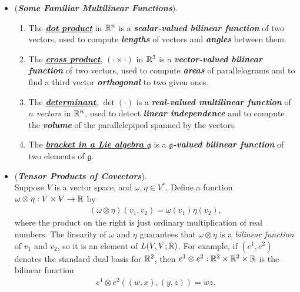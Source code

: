 \documentclass[11pt]{article}
\begin{document}
\begin{itemize}
\item \begin{example} (\emph{\textbf{Some Familiar Multilinear Functions}}).\\
\begin{enumerate}
\item The \underline{\emph{\textbf{dot product}}}  in ${\mathbb R}^n$ is a \emph{\textbf{scalar-valued bilinear function}} of two vectors, used
to compute \emph{\textbf{lengths}} of vectors and \emph{\textbf{angles}} between them.
\item The \underline{\emph{\textbf{cross product}}}, $(\cdot \times \cdot)$ in ${\mathbb R}^3$ is a \emph{\textbf{vector-valued bilinear function}} of two vectors, used
to compute \emph{\textbf{areas}} of parallelograms and to find a third vector \emph{\textbf{orthogonal}} to two given ones.
\item The \underline{\emph{\textbf{determinant}}}, $\det(\cdot)$ is a \emph{\textbf{real-valued multilinear function}} of \emph{$n$ vectors} in ${\mathbb R}^n$, used
to detect \emph{\textbf{linear independence}} and to compute the \emph{\textbf{volume}} of the parallelepiped spanned by the vectors.
\item The \underline{\emph{\textbf{bracket in a Lie algebra $\mathfrak{g}$}}} is a \emph{\textbf{$\mathfrak{g}$-valued bilinear function}} of two elements of $\mathfrak{g}$.
\end{enumerate}
\end{example}

\item \begin{example}(\emph{\textbf{Tensor Products of Covectors}}).\\
Suppose $V$ is a vector space, and $\omega, \eta \in V^{*}$. Define a function $\omega \otimes \eta: V \times V \rightarrow {\mathbb R}$ by
\begin{align*}
(\omega \otimes \eta)(v_1,v_2) =\omega(v_1) \eta(v_2),
\end{align*} where the product on the right is just ordinary multiplication of real numbers. The linearity of $\omega$ and $\eta$ guarantees that $\omega \otimes \eta$ is a \emph{bilinear function} of $v_1$ and $v_2$, so it is an element of $L(V,V ; {\mathbb R})$. For example, if $(e^1, e^2)$ denotes the standard dual basis for ${\mathbb R}^2$, then $e^1 \otimes e^2: {\mathbb R}^2 \times {\mathbb R}^2 \times {\mathbb R}$ is the bilinear function
\begin{align*}
e^1 \otimes e^2((w,x), (y,z)) = wz.
\end{align*}
\end{example}


\end{itemize}
\end{document}
